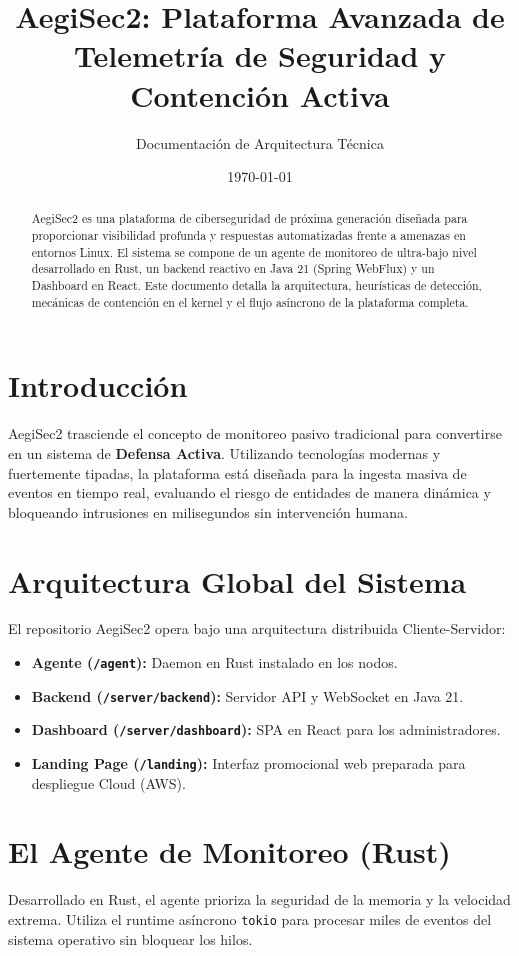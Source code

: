 \documentclass[12pt,a4paper]{article}
\title{\textbf{AegiSec2: Plataforma Avanzada de Telemetría de Seguridad y Contención Activa}}
\author{Documentación de Arquitectura Técnica}
\date{\today}
\begin{document}
\maketitle

\begin{abstract}
AegiSec2 es una plataforma de ciberseguridad de próxima generación diseñada para proporcionar visibilidad profunda y respuestas automatizadas frente a amenazas en entornos Linux. El sistema se compone de un agente de monitoreo de ultra-bajo nivel desarrollado en Rust, un backend reactivo en Java 21 (Spring WebFlux) y un Dashboard en React. Este documento detalla la arquitectura, heurísticas de detección, mecánicas de contención en el kernel y el flujo asíncrono de la plataforma completa.
\end{abstract}

\tableofcontents
\newpage

\section{Introducción}
AegiSec2 trasciende el concepto de monitoreo pasivo tradicional para convertirse en un sistema de \textbf{Defensa Activa}. Utilizando tecnologías modernas y fuertemente tipadas, la plataforma está diseñada para la ingesta masiva de eventos en tiempo real, evaluando el riesgo de entidades de manera dinámica y bloqueando intrusiones en milisegundos sin intervención humana.

\section{Arquitectura Global del Sistema}
El repositorio AegiSec2 opera bajo una arquitectura distribuida Cliente-Servidor:
\begin{itemize}
    \item \textbf{Agente (\texttt{/agent}):} Daemon en Rust instalado en los nodos.
    \item \textbf{Backend (\texttt{/server/backend}):} Servidor API y WebSocket en Java 21.
    \item \textbf{Dashboard (\texttt{/server/dashboard}):} SPA en React para los administradores.
    \item \textbf{Landing Page (\texttt{/landing}):} Interfaz promocional web preparada para despliegue Cloud (AWS).
\end{itemize}

\section{El Agente de Monitoreo (Rust)}
Desarrollado en Rust, el agente prioriza la seguridad de la memoria y la velocidad extrema. Utiliza el runtime asíncrono \texttt{tokio} para procesar miles de eventos del sistema operativo sin bloquear los hilos.
\end{document}
